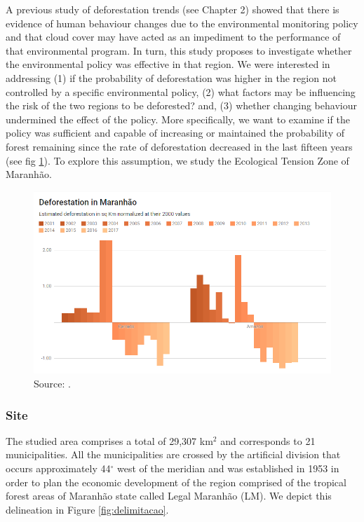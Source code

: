 A previous study of deforestation trends (see Chapter 2) showed that there is evidence of human behaviour changes due to the environmental monitoring policy and that cloud cover may have acted as an impediment to the performance of that environmental program. In turn, this study proposes to investigate whether the environmental policy was effective in that region. We were interested in addressing (1) if the probability of deforestation was higher in the region not controlled by a specific environmental policy, (2) what factors may be influencing the risk of the two regions to be deforested? and, (3) whether changing behaviour undermined the effect of the policy. More specifically, we want to examine if the policy was sufficient and capable of increasing or maintained the probability of forest remaining since the rate of deforestation decreased in the last fifteen years (see fig \ref{fig:defAmazonMA}). To explore this assumption, we study the Ecological Tension Zone of Maranhão.

\begin{figure}[H]
  \centering
  \includegraphics[width=1\textwidth, inner]{Normalizeddeforestation.png}
\caption{Source: \citep{MMMAwebsite}.}
\label{fig:defAmazonMA}
\end{figure}

\subsubsection{Site}
The studied area comprises a total of 29,307 km$^{2}$ and corresponds to 21 municipalities. All the municipalities are crossed by the artificial division that occurs approximately 44$^{\circ}$ west of the meridian and was established in 1953 in order to plan the economic development of the region comprised of the tropical forest areas of Maranhão state called Legal Maranhão (LM). We depict this delineation in Figure \ref{fig:delimitacao}.


